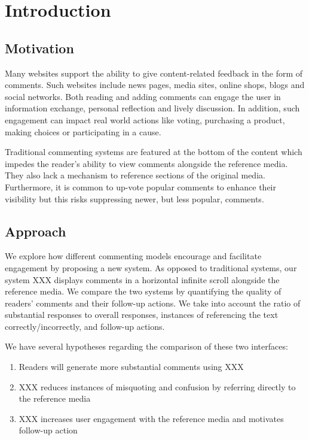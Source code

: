 \section{Introduction}

\subsection{Motivation}

Many websites support the ability to give content-related feedback in the form of comments. Such websites include news pages, media sites, online shops, blogs and social networks. Both reading and adding comments can engage
the user in information exchange, personal reflection and lively discussion. In addition, such engagement can impact real world actions like voting, purchasing a product, making choices or participating in a cause. 

Traditional commenting systems are featured at the bottom of the content which impedes the reader's ability to view comments alongside the reference media. They also lack a mechanism to reference sections of the original media. Furthermore, it is common to up-vote popular comments to enhance their visibility but this risks suppressing newer, but less popular, comments.

\subsection{Approach}

We explore how different commenting models encourage and facilitate engagement by proposing a new system. As opposed to traditional systems, our system XXX displays comments in a horizontal infinite scroll alongside the reference media. We compare the two systems by quantifying the quality of readers' comments and their follow-up actions. We take into account the ratio of substantial responses to overall responses, instances of referencing the text correctly/incorrectly, and follow-up actions.

We have several hypotheses regarding the comparison of these two interfaces:
\begin{enumerate}
\item Readers will generate more substantial comments using XXX
\item XXX reduces instances of misquoting and confusion by referring directly to the reference media
\item XXX increases user engagement with the reference media and motivates follow-up action
\end{enumerate}

